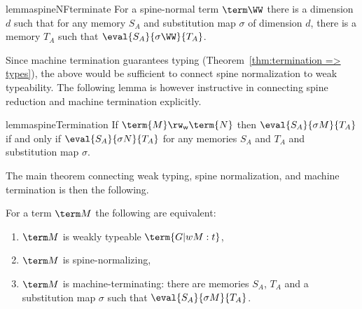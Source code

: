 \documentclass[a4paper,UKenglish,cleveref, autoref, thm-restate]{lipics-v2021}
\newcommand\spine{\mathsf w}
\begin{document}
\begin{restatable}{lemma}{spineNFterminate}
\label{lem:spine-normal => runs}
For a spine-normal term $\term\WW$ there is a dimension $d$ such that for any memory $S_A$ and substitution map $\sigma$ of dimension $d$, there is a memory $T_A$ such that $\eval {S_A}{\sigma\WW}{T_A}$.
\end{restatable}


Since machine termination guarantees typing (Theorem~\ref{thm:termination => types}), the above would be sufficient to connect spine normalization to weak typeability. The following lemma is however instructive in connecting spine reduction and machine termination explicitly.


\begin{restatable}{lemma}{spineTermination}
\label{lem:spine reduction preserves termination}
If $\term{M}\rw_\spine\term{N}$ then $\eval{S_A}{\sigma M}{T_A}$ if and only if $\eval{S_A}{\sigma N}{T_A}$ for any memories $S_A$ and $T_A$ and substitution map $\sigma$.
\end{restatable}


The main theorem connecting weak typing, spine normalization, and machine termination is then the following.


\begin{theorem}
\label{thm:weak}
For a term $\term M$ the following are equivalent:
\begin{enumerate}

\item\label{case:w} $\term M$ is weakly typeable $\term{G |w M:t}$,
\item\label{case:s} $\term M$ is spine-normalizing,
\item\label{case:t} $\term M$ is machine-terminating: there are memories $S_A$, $T_A$ and a substitution map $\sigma$ such that $\eval{S_A}{\sigma M}{T_A}$.

\end{enumerate}
\end{theorem}
\end{document}
